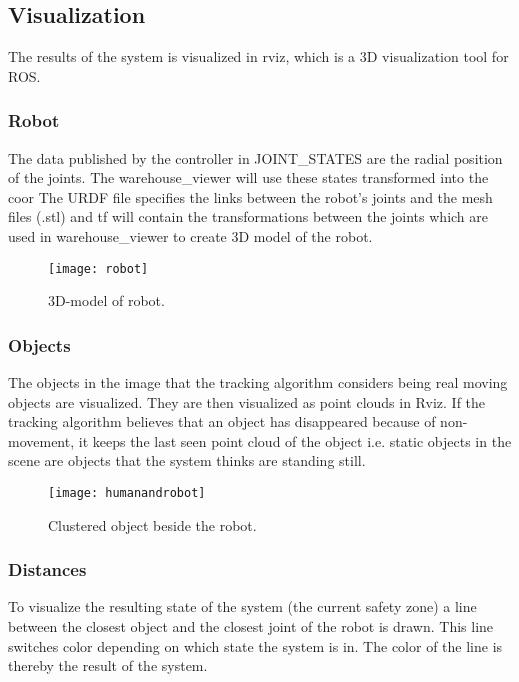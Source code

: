\subsection{Visualization}

The results of the system is visualized in rviz, which is a 3D visualization tool for ROS. 

\subsubsection{Robot}
The data published by the controller in JOINT\_STATES are the radial position of the joints. The warehouse\_viewer will use these states transformed into the coor The URDF file specifies the links between the robot’s joints and the mesh files (.stl) and tf will contain the transformations between the joints which are used in warehouse\_viewer to create 3D model of the robot. 

\begin{figure}[H]
\begin{center}
\texttt{[image: robot]}
\caption{3D-model of robot.}

\end{center}
\end{figure}

\subsubsection{Objects}
The objects in the image that the tracking algorithm considers being real moving objects are visualized. They are then visualized as point clouds in Rviz. If the tracking algorithm believes that an object has disappeared because of non-movement, it keeps the last seen point cloud of the object i.e. static objects in the scene are objects that the system thinks are standing still. 

\begin{figure}[H]
\begin{center}
\texttt{[image: humanandrobot]}
\caption{Clustered object beside the robot.}

\end{center}
\end{figure}


\subsubsection{Distances}
To visualize the resulting state of the system (the current safety zone) a line between the closest object and the closest joint of the robot is drawn. This line switches color depending on which state the system is in. The color of the line is thereby the result of the system. 

